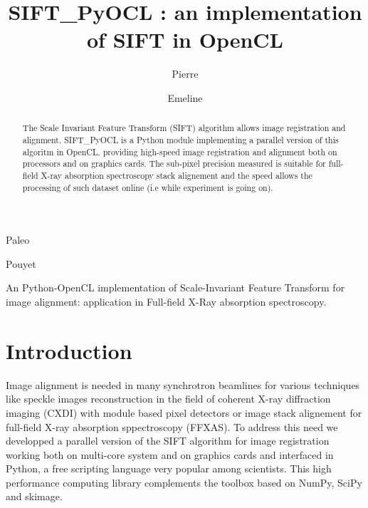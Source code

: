 \documentclass[preprint]{iucr}
\begin{document}
\title{SIFT\_PyOCL : an implementation of SIFT in OpenCL}

    \author[a]{Pierre}{Paleo}
    \author[a]{Emeline}{Pouyet}

\maketitle

\begin{synopsis}
An Python-OpenCL implementation of Scale-Invariant Feature Transform for image
alignment: application in Full-field X-Ray absorption spectroscopy.
\end{synopsis}

\begin{abstract}
The Scale Invariant Feature Transform (SIFT) algorithm allows image registration
and alignment. 
SIFT\_PyOCL is a Python module implementing a parallel version of this algoritm
in OpenCL,  providing high-speed image registration and alignment both on
processors and on graphics cards. 
The sub-pixel precision measured is suitable for full-field X-ray 
absorption spectroscopy stack alignement and the speed allows the processing of
such dataset online (i.e while experiment is going on).

\end{abstract}

\section{Introduction}

Image alignment is needed in many synchrotron beamlines for
various techniques like speckle images reconstruction in the field of coherent
X-ray diffraction imaging (CXDI) with module based pixel detectors or image
stack alignement for full-field X-ray absorption sppectroscopy (FFXAS).
To address this need we developped a parallel
version of the SIFT algorithm for image registration working both on multi-core
system and on graphics cards and interfaced in Python, a free scripting language
very popular among scientists. This high performance computing library complements
the toolbox based on NumPy\cite{numpy}, SciPy\cite{scipy} and
skimage\cite{skimage}.
\end{document}
